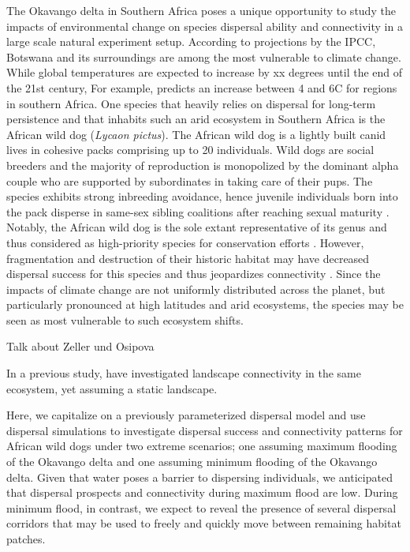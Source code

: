 \documentclass[abstract=on,10pt,a4paper,bibliography=totocnumbered]{article}
\begin{document}
The Okavango delta in Southern Africa poses a unique opportunity to study the
impacts of environmental change on species dispersal ability and connectivity in a
large scale natural experiment setup. According to projections by the IPCC,
Botswana and its surroundings are among the most vulnerable to climate change.
While global temperatures are expected to increase by xx degrees until the end
of the 21st century, For example, \cite{Engelbrecht.2015} predicts an increase
between 4 and 6\degree C for regions in southern Africa. One species that
heavily relies on dispersal for long-term persistence and that inhabits such an
arid ecosystem in Southern Africa is the African wild dog (\textit{Lycaon
pictus}). The African wild dog is a lightly built canid lives in cohesive packs
comprising up to 20 individuals. Wild dogs are social breeders and the majority
of reproduction is monopolized by the dominant alpha couple who are supported by
subordinates in taking care of their pups. The species exhibits strong
inbreeding avoidance, hence juvenile individuals born into the pack disperse in
same-sex sibling coalitions after reaching sexual maturity \citep{McNutt.1996,
Behr.2020}. Notably, the African wild dog is the sole extant representative of
its genus and thus considered as high-priority species for conservation efforts
\citep{Leigh.2012}. However, fragmentation and destruction of their historic
habitat may have decreased dispersal success for this species and thus
jeopardizes connectivity \citep{Leigh.2012}. Since the impacts of climate change
are not uniformly distributed across the planet, but particularly pronounced at
high latitudes and arid ecosystems, the species may be seen as most vulnerable
to such ecosystem shifts.

Talk about Zeller und Osipova

In a previous study, \citep{Hofmann.2022} have investigated landscape
connectivity in the same ecosystem, yet assuming a static landscape.

Here, we capitalize on a previously parameterized dispersal model and use
dispersal simulations to investigate dispersal success and connectivity patterns
for African wild dogs under two extreme scenarios; one assuming maximum flooding
of the Okavango delta and one assuming minimum flooding of the Okavango delta.
Given that water poses a barrier to dispersing individuals, we anticipated that
dispersal prospects and connectivity during maximum flood are low. During
minimum flood, in contrast, we expect to reveal the presence of several
dispersal corridors that may be used to freely and quickly move between
remaining habitat patches.
\end{document}
